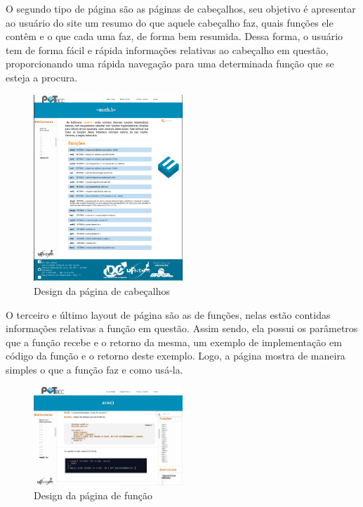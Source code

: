 \documentclass{article}
\begin{document}
O segundo tipo de página são as páginas de cabeçalhos, seu objetivo é apresentar ao usuário do site um resumo do que aquele cabeçalho faz, quais funções ele contêm e o que cada uma faz, de forma bem resumida. Dessa forma, o usuário tem de forma fácil e rápida informações relativas ao cabeçalho em questão, proporcionando uma rápida navegação para uma determinada função que se esteja a procura.

\begin{figure}
  \caption{Design da página de cabeçalhos}
  \centering
  \includegraphics[width=0.5\textwidth]{print_pagina_cabecalhos.png}
\end{figure}

O terceiro e último layout de página são as de funções, nelas estão contidas informações relativas a função em questão. Assim sendo, ela possui os parâmetros que a função recebe e o retorno da mesma, um exemplo de implementação em código da função e o retorno deste exemplo. Logo, a página mostra de maneira simples o que a função faz e como usá-la.

\begin{figure}
  \caption{Design da página de função}
  \centering
  \includegraphics[width=0.5\textwidth]{print_pagina_funcao.png}
\end{figure}
\end{document}

